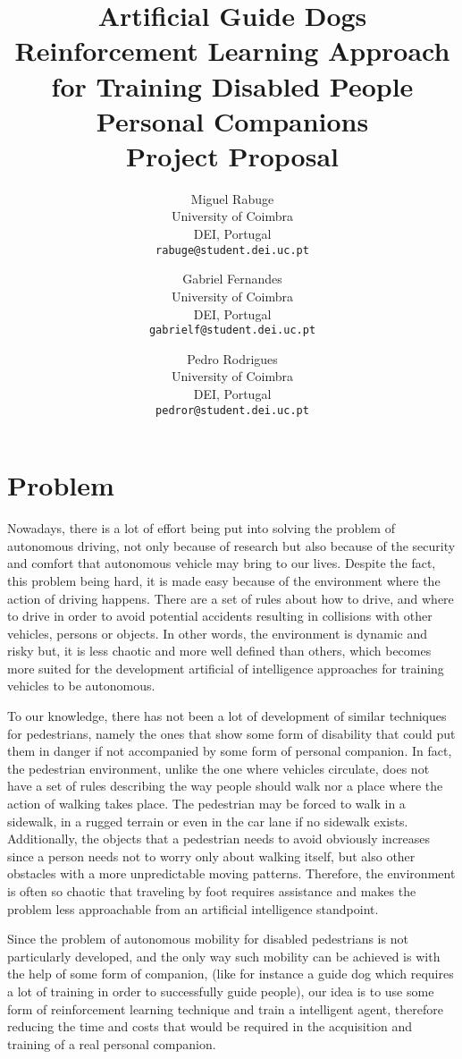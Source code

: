 \documentclass[letterpaper,10pt]{article}
\title{
  \textbf{Artificial Guide Dogs} \\\vspace{2pt}
  \large{Reinforcement Learning Approach for Training Disabled People 
  Personal Companions} \\\vspace{2pt}
  \Large{Project Proposal} 
}
\author{
  Miguel Rabuge\\
  University of Coimbra\\
  DEI, Portugal \\
  \texttt{rabuge@student.dei.uc.pt}
  \and
  Gabriel Fernandes\\
  University of Coimbra\\
  DEI, Portugal\\
  \texttt{gabrielf@student.dei.uc.pt}
  \and
  Pedro Rodrigues\\
  University of Coimbra\\
  DEI, Portugal \\
  \texttt{pedror@student.dei.uc.pt}
}
\begin{document}
\maketitle
\tableofcontents

\section{Problem}

Nowadays, there is a lot of effort being put into solving the problem of 
autonomous driving, not only because of research but also because of the 
security and comfort that autonomous vehicle may bring to our lives. Despite 
the fact, this problem being hard, it is made easy because of the environment
where the action of driving happens. There are a set of rules about how 
to drive, and where to drive in order to avoid potential accidents resulting 
in collisions with other vehicles, persons or objects. In other words, the 
environment is dynamic and risky but, it is less chaotic and more well defined 
than others, which becomes more suited for the development artificial of
intelligence approaches for training vehicles to be autonomous.

To our knowledge, there has not been a lot of development of similar
techniques for pedestrians, namely the ones that show some form of 
disability that could put them in danger if not accompanied by some form 
of personal companion. In fact, the pedestrian environment, unlike the
one where vehicles circulate, does not have a set of rules describing the 
way people should walk nor a place where the action of walking takes place.
The pedestrian may be forced to walk in a sidewalk, in a rugged terrain or 
even in the car lane if no sidewalk exists. Additionally, the objects that 
a pedestrian needs to avoid obviously increases since a person needs not to
worry only about walking itself, but also other obstacles with a more
unpredictable moving patterns. Therefore, the environment is often so chaotic 
that traveling by foot requires assistance and makes the problem less 
approachable from an artificial intelligence standpoint.

Since the problem of autonomous mobility for disabled pedestrians is not
particularly developed, and the only way such mobility can be achieved is
with the help of some form of companion, (like for instance a guide dog
which requires a lot of training in order to successfully guide people), 
our idea is to use some form of reinforcement learning technique and train 
a intelligent agent, therefore reducing the time and costs that would be 
required in the acquisition and training of a real personal companion. 
\end{document}
